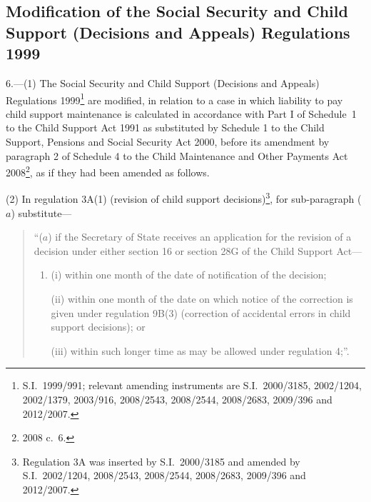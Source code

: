\documentclass[12pt,a4paper]{article}
\begin{document}
\subsection[6. Modification of the Social Security and Child Support (Decisions and Appeals) Regulations 1999]{Modification of the Social Security and Child Support (Decisions and Appeals) Regulations 1999}

6.—(1) The Social Security and Child Support (Decisions and Appeals) Regulations 1999\footnote{S.I.~1999/991; relevant amending instruments are S.I.~2000/3185, 2002/1204, 2002/1379, 2003/916, 2008/2543, 2008/2544, 2008/2683, 2009/396 and 2012/2007.} are modified, in relation to a case in which liability to pay child support maintenance is calculated in accordance with Part I of Schedule~1 to the Child Support Act 1991 as substituted by Schedule 1 to the Child Support, Pensions and Social Security Act 2000, before its amendment by paragraph 2 of Schedule 4 to the Child Maintenance and Other Payments Act 2008\footnote{2008 c.~6.}, as if they had been amended as follows.

(2) In regulation 3A(1) (revision of child support decisions)\footnote{Regulation 3A was inserted by S.I.~2000/3185 and amended by S.I.~2002/1204, 2008/2543, 2008/2544, 2008/2683, 2009/396 and 2012/2007.}, for sub-paragraph ($a$)  substitute—
\begin{quotation}
“($a$) if the Secretary of State receives an application for the revision of a decision under either section 16 or section 28G of the Child Support Act—
\begin{enumerate}\item[]
(i) within one month of the date of notification of the decision;

(ii) within one month of the date on which notice of the correction is given under regulation 9B(3) (correction of accidental errors in child support decisions); or

(iii) within such longer time as may be allowed under regulation 4;”.
\end{enumerate}
\end{quotation}
\end{document}
